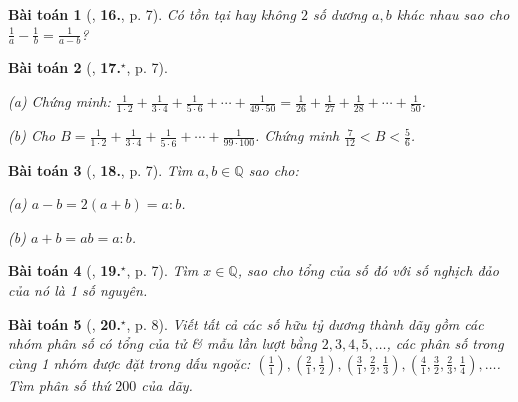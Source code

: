 \documentclass{article}
\numberwithin{equation}{section}
\newtheorem{baitoan}{Bài toán}[section]
\begin{document}
\begin{baitoan}[\cite{Binh_Toan_7_tap_1}, \textbf{16.}, p. 7]
	Có tồn tại hay không $2$ số dương $a,b$ khác nhau sao cho $\frac{1}{a} - \frac{1}{b} = \frac{1}{a - b}$?
\end{baitoan}

\begin{baitoan}[\cite{Binh_Toan_7_tap_1}, \textbf{17.}${}^\star$, p. 7]
	\begin{enumerate*}
		\item[(a)] Chứng minh: $\frac{1}{1\cdot 2} + \frac{1}{3\cdot 4} + \frac{1}{5\cdot 6} + \cdots + \frac{1}{49\cdot 50} = \frac{1}{26} + \frac{1}{27} + \frac{1}{28} + \cdots + \frac{1}{50}$.
		\item[(b)] Cho $B = \frac{1}{1\cdot 2} + \frac{1}{3\cdot 4} + \frac{1}{5\cdot 6} + \cdots + \frac{1}{99\cdot 100}$. Chứng minh $\frac{7}{12} < B < \frac{5}{6}$.
	\end{enumerate*}	
\end{baitoan}

\begin{baitoan}[\cite{Binh_Toan_7_tap_1}, \textbf{18.}, p. 7]
	Tìm $a,b\in\mathbb{Q}$ sao cho:
	\begin{enumerate*}
		\item[(a)] $a - b = 2(a + b) = a:b$.
		\item[(b)] $a + b = ab = a:b$.
	\end{enumerate*}
\end{baitoan}

\begin{baitoan}[\cite{Binh_Toan_7_tap_1}, \textbf{19.}${}^\star$, p. 7]
	Tìm $x\in\mathbb{Q}$, sao cho tổng của số đó với số nghịch đảo của nó là 1 số nguyên.
\end{baitoan}

\begin{baitoan}[\cite{Binh_Toan_7_tap_1}, \textbf{20.}${}^\star$, p. 8]
	Viết tất cả các số hữu tỷ dương  thành dãy gồm các nhóm phân số có tổng của tử \& mẫu lần lượt bằng $2,3,4,5,\ldots$, các phân số trong cùng 1 nhóm được đặt trong dấu ngoặc: $\left(\frac{1}{1}\right),\left(\frac{2}{1},\frac{1}{2}\right),\left(\frac{3}{1},\frac{2}{2},\frac{1}{3}\right),\left(\frac{4}{1},\frac{3}{2},\frac{2}{3},\frac{1}{4}\right),\ldots$. Tìm phân số thứ $200$ của dãy.
\end{baitoan}

\end{document}
